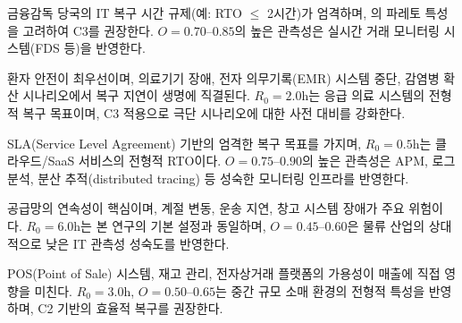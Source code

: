 금융감독 당국의 IT 복구 시간 규제(예: RTO $\leq$ 2시간)가 엄격하며,
의 파레토 특성을 고려하여
C3를 권장한다. $O = 0.70$--$0.85$의 높은 관측성은 실시간 거래
모니터링 시스템(FDS 등)을 반영한다.

환자 안전이 최우선이며, 의료기기 장애, 전자 의무기록(EMR) 시스템 중단,
감염병 확산 시나리오에서 복구 지연이 생명에 직결된다.
$R_0 = 2.0$h는 응급 의료 시스템의 전형적 복구 목표이며,
C3 적용으로 극단 시나리오에 대한 사전 대비를 강화한다.

SLA(Service Level Agreement) 기반의 엄격한 복구 목표를 가지며,
$R_0 = 0.5$h는 클라우드/SaaS 서비스의 전형적 RTO이다.
$O = 0.75$--$0.90$의 높은 관측성은 APM, 로그 분석, 분산 추적(distributed
tracing) 등 성숙한 모니터링 인프라를 반영한다.

공급망의 연속성이 핵심이며, 계절 변동, 운송 지연, 창고 시스템 장애가
주요 위험이다. $R_0 = 6.0$h는 본 연구의 기본 설정과 동일하며,
$O = 0.45$--$0.60$은 물류 산업의 상대적으로 낮은 IT 관측성 성숙도를 반영한다.

POS(Point of Sale) 시스템, 재고 관리, 전자상거래 플랫폼의 가용성이
매출에 직접 영향을 미친다. $R_0 = 3.0$h, $O = 0.50$--$0.65$는
중간 규모 소매 환경의 전형적 특성을 반영하며, C2 기반의 효율적 복구를 권장한다.




